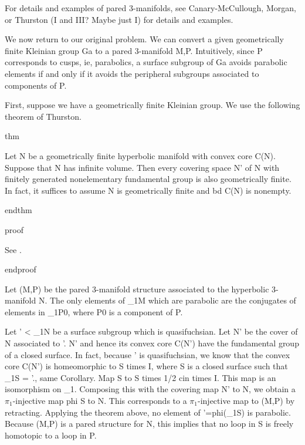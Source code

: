For details and examples of pared 3-manifolds, see Canary-McCullough, Morgan,
or Thurston (I and III? Maybe just I) for details and examples.

We now return to our original problem. We can convert a given geometrically
finite Kleinian group Ga to a pared 3-manifold M,P. Intuitively, since
P corresponds to cusps, ie, parabolics, a surface subgroup of Ga avoids
parabolic elements if and only if it avoids the peripheral subgroups associated
to components of P.

First, suppose we have a geometrically finite Kleinian group.  We use the
following theorem of Thurston.

thm

Let N be a geometrically finite hyperbolic manifold with convex core C(N).
Suppose that N has infinite volume. Then every covering space N' of N with
finitely generated nonelementary fundamental group is also geometrically
finite. In fact, it suffices to assume N is geometrically finite and bd C(N) is
nonempty.


endthm

proof

See \cite{Mo}. %

endproof


Let (M,P) be the pared 3-manifold structure associated to the hyperbolic
3-manifold N. The only elements of \pi_1M which are parabolic are the conjugates
of elements in \pi_1P0, where P0 is a component of P.

Let \Ga' < \pi_1N be a surface subgroup which is quasifuchsian. Let N' be the
cover of N associated to \Ga'. N' and hence its convex core C(N') have the
fundamental group of a closed surface. In fact, because \Ga' is
quasifuchsian, we know that the convex core C(N') is homeomorphic to S times I,
where S is a closed surface such that \pi_1S = \Ga'.\cite{Mo}, same Corollary.
Map S to S times 1/2 cin times I. This map is an isomorphism on \pi_1. Composing
this with the covering map N' to N, we obtain a $\pi_1$-injective map phi \colon
S to N.  This corresponds to a $\pi_1$-injective map to (M,P) by retracting.
Applying the theorem above, no element of \Ga'=phi(\pi_1S) is parabolic.
Because (M,P) is a pared structure for N, this implies that no loop in S is
freely homotopic to a loop in P.

